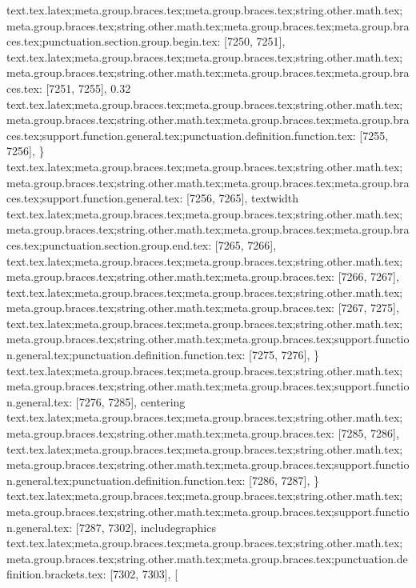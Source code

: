 {{{{{{{{{{{{{{{{{{{{{{{{{{{{{{{{{{{{{{{{{{{{{{{{{{{{{{{{{{{{{{{{{{{{{{{{{{{{{{{{{{{{{{{{{{{{{{{{{{{{{{{{{{{{{{{{{{{{{{{{{{{{{{{{{{{{{{{{{{{{{{{{{{{{{{{{{{{{{{{{{{{{{{{{{{{{{{{{{{{{{{{{{{{{{{{{text.tex.latex;meta.group.braces.tex;meta.group.braces.tex;string.other.math.tex;meta.group.braces.tex;string.other.math.tex;meta.group.braces.tex;meta.group.braces.tex;punctuation.section.group.begin.tex: [7250, 7251], {{}
text.tex.latex;meta.group.braces.tex;meta.group.braces.tex;string.other.math.tex;meta.group.braces.tex;string.other.math.tex;meta.group.braces.tex;meta.group.braces.tex: [7251, 7255], {0.32}
text.tex.latex;meta.group.braces.tex;meta.group.braces.tex;string.other.math.tex;meta.group.braces.tex;string.other.math.tex;meta.group.braces.tex;meta.group.braces.tex;support.function.general.tex;punctuation.definition.function.tex: [7255, 7256], {\}
text.tex.latex;meta.group.braces.tex;meta.group.braces.tex;string.other.math.tex;meta.group.braces.tex;string.other.math.tex;meta.group.braces.tex;meta.group.braces.tex;support.function.general.tex: [7256, 7265], {textwidth}
text.tex.latex;meta.group.braces.tex;meta.group.braces.tex;string.other.math.tex;meta.group.braces.tex;string.other.math.tex;meta.group.braces.tex;meta.group.braces.tex;punctuation.section.group.end.tex: [7265, 7266], {}}
text.tex.latex;meta.group.braces.tex;meta.group.braces.tex;string.other.math.tex;meta.group.braces.tex;string.other.math.tex;meta.group.braces.tex: [7266, 7267], {
}
text.tex.latex;meta.group.braces.tex;meta.group.braces.tex;string.other.math.tex;meta.group.braces.tex;string.other.math.tex;meta.group.braces.tex: [7267, 7275], {        }
text.tex.latex;meta.group.braces.tex;meta.group.braces.tex;string.other.math.tex;meta.group.braces.tex;string.other.math.tex;meta.group.braces.tex;support.function.general.tex;punctuation.definition.function.tex: [7275, 7276], {\}
text.tex.latex;meta.group.braces.tex;meta.group.braces.tex;string.other.math.tex;meta.group.braces.tex;string.other.math.tex;meta.group.braces.tex;support.function.general.tex: [7276, 7285], {centering}
text.tex.latex;meta.group.braces.tex;meta.group.braces.tex;string.other.math.tex;meta.group.braces.tex;string.other.math.tex;meta.group.braces.tex: [7285, 7286], { }
text.tex.latex;meta.group.braces.tex;meta.group.braces.tex;string.other.math.tex;meta.group.braces.tex;string.other.math.tex;meta.group.braces.tex;support.function.general.tex;punctuation.definition.function.tex: [7286, 7287], {\}
text.tex.latex;meta.group.braces.tex;meta.group.braces.tex;string.other.math.tex;meta.group.braces.tex;string.other.math.tex;meta.group.braces.tex;support.function.general.tex: [7287, 7302], {includegraphics}
text.tex.latex;meta.group.braces.tex;meta.group.braces.tex;string.other.math.tex;meta.group.braces.tex;string.other.math.tex;meta.group.braces.tex;punctuation.definition.brackets.tex: [7302, 7303], {[}
}}}}}}}}}}}}}}}}}}}}}}}}}}}}}}}}}}}}}}}}}}}}}}}}}}}}}}}}}}}}}}}}}}}}}}}}}}}}}}}}}}}}}}}}}}}}}}}}}}}}}}}}}}}}}}}}}}}}}}}}}}}}}}}}}}}}}}}}}}}}}}}}}}}}}}}}}}}}}}}}}}}}}}}}}}}}}}}}}}}}}}}}}}}}}}}}}}}
